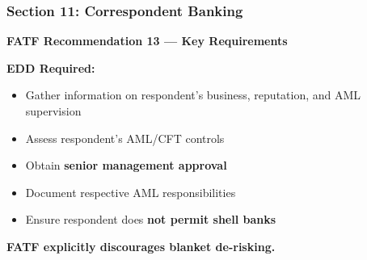 \documentclass[12pt,aspectratio=169]{beamer}
\renewcommand{\scriptsize}{\fontsize{5}{6}\selectfont}
\newcommand{\keypoint}[1]{\textcolor{deepblue}{\textbf{#1}}}
\begin{document}
	\begin{frame}
		\frametitle{\fontsize{13}{15}\selectfont \textbf{Section 11: Correspondent Banking}}
		\vspace{0.3cm}
		\begin{center}
			{\fontsize{12}{14}\selectfont \textbf{FATF Recommendation 13 — Key Requirements}}
		\end{center}
		\vspace{0.2cm}
		\begin{block}{}
			\scriptsize
			\textbf{EDD Required:}
			\begin{itemize}
				\item Gather information on respondent's business, reputation, and AML supervision
				\item Assess respondent's AML/CFT controls
				\item Obtain \textbf{senior management approval}
				\item Document respective AML responsibilities
				\item Ensure respondent does \textbf{not permit shell banks}
			\end{itemize}
			\vspace{0.1cm}
			\keypoint{FATF explicitly discourages blanket de-risking.}
		\end{block}
	\end{frame}
	
\end{document}
